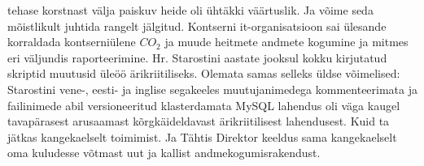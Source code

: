 \documentclass[nobib]{tufte-handout}
\begin{document}
 tehase korstnast välja paiskuv heide oli ühtäkki väärtuslik. Ja võime seda mõistlikult juhtida rangelt jälgitud. Kontserni it-organisatsioon sai ülesande korraldada kontserniülene $CO_2$ ja muude heitmete andmete kogumine ja mitmes eri väljundis raporteerimine. Hr. Starostini aastate jooksul kokku kirjutatud skriptid muutusid üleöö ärikriitiliseks. Olemata samas selleks üldse võimelised: Starostini vene-, eesti- ja inglise segakeeles muutujanimedega kommenteerimata ja failinimede abil versioneeritud klasterdamata MySQL lahendus oli väga kaugel tavapärasest arusaamast kõrgkäideldavast ärikriitilisest lahendusest. Kuid ta jätkas kangekaelselt toimimist. Ja Tähtis Direktor keeldus sama kangekaelselt oma kuludesse võtmast uut ja kallist andmekogumisrakendust. 
\end{document}
